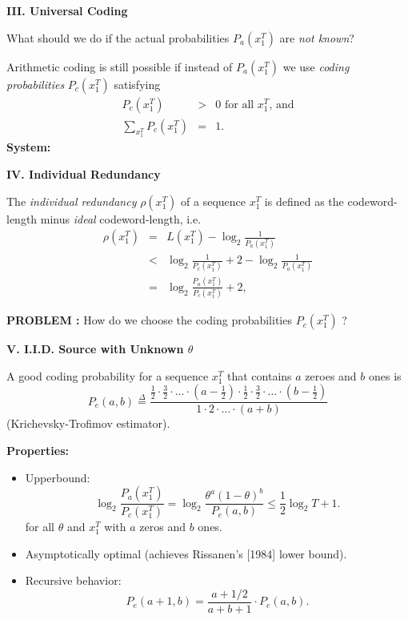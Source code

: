 \documentclass[a4paper,landscape]{slides} %
\newcommand{\define}{\stackrel{\Delta}{=}}
\newcommand{\xT}{x_{1}^{T}}
\begin{document}
\begin{slide}{\bf\Large\color{blue} III. Universal Coding}

What should we do if the actual probabilities $P_{a}(\xT)$ are {\em
not known}?

Arithmetic coding is still possible if instead of
$P_{a}(\xT)$ we use {\em coding probabilities} $P_{c}(\xT)$ satisfying
\begin{eqnarray}
P_{c}(\xT) &>&  0 \text{ for all $\xT$, and} \nonumber \\
\sum_{\xT} P_{c}(\xT) &= &1. \nonumber
\end{eqnarray}
{\bf System:}
\begin{center}

\end{center}
\end{slide}
\begin{slide}{\bf\Large\color{blue} IV. Individual Redundancy}

The {\em individual redundancy} $\rho(\xT)$ of a sequence $\xT$ is
defined as the codeword-length minus {\em ideal} codeword-length, i.e.
\begin{eqnarray*}
\rho(\xT)
&=& L(\xT) - \log_{2}\frac{1}{P_{a}(\xT)} \\
&< & \log_{2}\frac{1}{P_c(\xT)} +2 -\log_{2}\frac{1}{P_{a}(\xT)} \\
&=& \log_{2}\frac{P_a(\xT)}{P_c(\xT)} +2,
\end{eqnarray*}


{\bf PROBLEM :} How do we choose the coding probabilities $P_{c}(\xT)$ ?
\end{slide}
\begin{slide}{\bf\Large\color{blue} V. I.I.D. Source with Unknown $\theta$}

A good coding probability for a sequence $\xT$ that contains
$a$ zeroes and $b$ ones is
\[
P_{e}(a,b) \define \frac{ \frac12 \cdot \frac32 \cdot \hdots \cdot (a-\frac12) \cdot
                          \frac12 \cdot \frac32 \cdot \hdots \cdot (b-\frac12)  }{1 \cdot 2 \cdot \hdots \cdot (a+b)}
\]
(Krichevsky-Trofimov estimator).

{\bf Properties:}
\begin{itemize}
\item\vspace{-10mm}
Upperbound:
\[
\log_2 \frac{P_{a}(\xT)}{P_{c}(\xT)}
= \log_{2} \frac{\theta^{a}(1-\theta)^{b}}{P_e(a,b)} \leq \frac12 \log_{2} T + 1.
\]
for all $\theta$ and $\xT$ with $a$ zeros and $b$ ones.
\item
\vspace{-10mm}
Asymptotically optimal (achieves Rissanen's [1984] lower bound).
\item
\vspace{-10mm} Recursive behavior:
\[
P_{e}(a+1,b) = \frac{a+1/2}{a+b+1} \cdot P_{e}(a,b).
\]
\end{itemize}
\end{slide}
\end{document}
